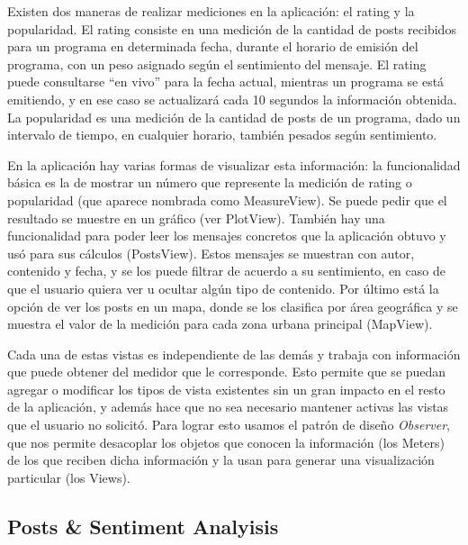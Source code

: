 Existen dos maneras de realizar mediciones en la aplicación: el rating y la popularidad. El rating consiste en una medición de la cantidad de posts recibidos para un programa en determinada fecha, durante el horario de emisión del programa, con un peso asignado según el sentimiento del mensaje. El rating puede consultarse ``en vivo'' para la fecha actual, mientras un programa se está emitiendo, y en ese caso se actualizará cada 10 segundos la información obtenida. La popularidad es una medición de la cantidad de posts de un programa, dado un intervalo de tiempo, en cualquier horario, también pesados según sentimiento.
\medskip

En la aplicación hay varias formas de visualizar esta información: la funcionalidad básica es la de mostrar un número que represente la medición de rating o popularidad (que aparece nombrada como MeasureView). Se puede pedir que el resultado se muestre en un gráfico (ver PlotView). También hay una funcionalidad para poder leer los mensajes concretos que la aplicación obtuvo y usó para sus cálculos (PostsView). Estos mensajes se muestran con autor, contenido y fecha, y se los puede filtrar de acuerdo a su sentimiento, en caso de que el usuario quiera ver u ocultar algún tipo de contenido. Por último está la opción de ver los posts en un mapa, donde se los clasifica por área geográfica y se muestra el valor de la medición para cada zona urbana principal (MapView).
\medskip

Cada una de estas vistas es independiente de las demás y trabaja con información que puede obtener del medidor que le corresponde. Esto permite que se puedan agregar o modificar los tipos de vista existentes sin un gran impacto en el resto de la aplicación, y además hace que no sea necesario mantener activas las vistas que el usuario no solicitó. Para lograr esto usamos el patrón de diseño \textit{Observer}, que nos permite desacoplar los objetos que conocen la información (los Meters) de los que reciben dicha información y la usan para generar una visualización particular (los Views).

\subsection{Posts \& Sentiment Analyisis}

